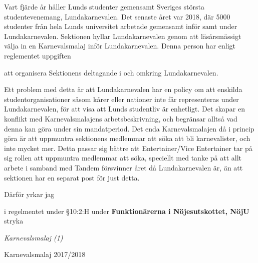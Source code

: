 \documentclass[../_main/handlingar.tex]{subfiles}
\begin{document}

Vart fjärde år håller Lunds studenter gemensamt Sveriges största studentevenemang, Lundakarnevalen. 
Det senaste året var 2018, där 5000 studenter från hela Lunds universitet arbetade gemensamt inför samt under Lundakarnevalen. 
Sektionen hyllar Lundakarnevalen genom att läsårsmässigt välja in en Karnevalsmalaj inför Lundakarnevalen. 
Denna person har enligt reglementet uppgiften 
\begin{dashlist}
    \item att organisera Sektionens deltagande i och omkring Lundakarnevalen.
\end{dashlist}

Ett problem med detta är att Lundakarnevalen har en policy om att enskilda studentorganisationer såsom kårer eller nationer inte får representeras under Lundakarnevalen, för att visa att Lunds studentliv är enhetligt.
Det skapar en konflikt med Karnevalsmalajens arbetsbeskrivning, och begränsar alltså vad denna kan göra under sin mandatperiod. Det enda Karnevalsmalajen då i princip göra är att uppmuntra sektionens medlemmar att söka att bli karnevalister, och inte mycket mer.
Detta passar sig bättre att Entertainer/Vice Entertainer tar på sig rollen att uppmuntra medlemmar att söka, speciellt med tanke på att allt arbete i samband med Tandem försvinner året då Lundakarnevalen är, än att sektionen har en separat post för just detta.


Därför yrkar jag 
\begin{attsatser}

    \att i regelmentet under \S10:2:H under \textbf {Funktionärerna i Nöjesutskottet, NöjU} stryka 
    \par \textit{Karnevalsmalaj (1)}

\end{attsatser}


\begin{signatures}{1}
    \isekt
    \signature{Filip Larsson}{Karnevalsmalaj 2017/2018}
\end{signatures}
\end{document}
